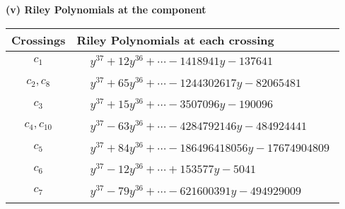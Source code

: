 \documentclass[1p]{elsarticle_modified}
\theoremstyle{definition}
\begin{document}
\newpage\renewcommand{\arraystretch}{1}
\flushleft \textbf{(v) Riley Polynomials at the component}\newline \\
\begin{tabular}{m{50pt}|m{274pt}}
Crossings & \hspace{64pt}Riley Polynomials at each crossing \\
\hline $$\begin{aligned}c_{1}\end{aligned}$$&$\begin{aligned}
&y^{37}+12 y^{36}+\cdots-1418941 y-137641
\end{aligned}$\\
\hline $$\begin{aligned}c_{2},c_{8}\end{aligned}$$&$\begin{aligned}
&y^{37}+65 y^{36}+\cdots-1244302617 y-82065481
\end{aligned}$\\
\hline $$\begin{aligned}c_{3}\end{aligned}$$&$\begin{aligned}
&y^{37}+15 y^{36}+\cdots-3507096 y-190096
\end{aligned}$\\
\hline $$\begin{aligned}c_{4},c_{10}\end{aligned}$$&$\begin{aligned}
&y^{37}-63 y^{36}+\cdots-4284792146 y-484924441
\end{aligned}$\\
\hline $$\begin{aligned}c_{5}\end{aligned}$$&$\begin{aligned}
&y^{37}+84 y^{36}+\cdots-186496418056 y-17674904809
\end{aligned}$\\
\hline $$\begin{aligned}c_{6}\end{aligned}$$&$\begin{aligned}
&y^{37}-12 y^{36}+\cdots+153577 y-5041
\end{aligned}$\\
\hline $$\begin{aligned}c_{7}\end{aligned}$$&$\begin{aligned}
&y^{37}-79 y^{36}+\cdots-621600391 y-494929009
\end{aligned}$\\

\end{tabular}
\end{document}
